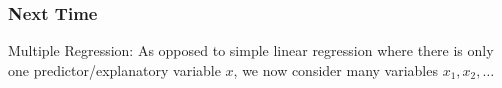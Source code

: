 \documentclass[slides]{beamer}
\newcommand{\blue}[1]{\textcolor{blue2}{#1}}
\begin{document}
\begin{frame}[fragile]
\frametitle{Next Time}

Multiple Regression:  As opposed to \blue{simple linear regression} where there is only one predictor/explanatory variable $x$, we now consider \blue{many} variables $x_1, x_2, \ldots$

\end{frame}
\end{document}
